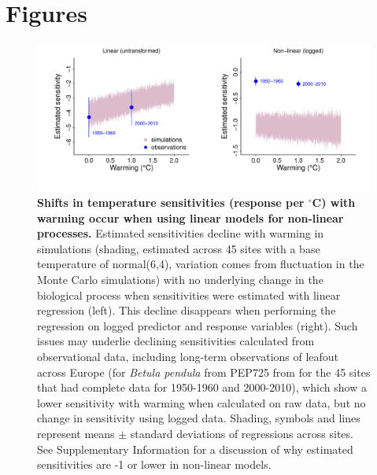 \documentclass[11pt,letter]{article}
\begin{document}
\newpage
\section* {Figures}

\begin{figure}[h!]
\centering
\noindent \includegraphics[width=1.05\textwidth]{..//analyses/figures/basicsimsandpepalt1.pdf} %
\caption{\textbf{Shifts in temperature sensitivities (response per $^{\circ}$C)  with warming occur when using linear models for non-linear processes.} Estimated sensitivities decline with warming in simulations (shading, estimated across 45 sites with a base temperature of normal(6,4), variation comes from fluctuation in the Monte Carlo simulations) with no underlying change in the biological process when sensitivities were estimated with linear regression (left). This decline disappears when performing the regression on logged predictor and response variables (right). Such issues may underlie declining sensitivities calculated from observational data, including long-term observations of leafout across Europe (for \emph{Betula pendula} from PEP725 from for the 45 sites that had complete data for 1950-1960 and 2000-2010), which show a lower sensitivity with warming when calculated on raw data, but no change in sensitivity using logged data. Shading, symbols and lines represent means $\pm$ standard deviations of regressions across sites. See Supplementary Information for a discussion of why estimated sensitivities are -1 or lower in non-linear models.} %
\label{fig:basicsimswpep} %
\end{figure}
\end{document}
